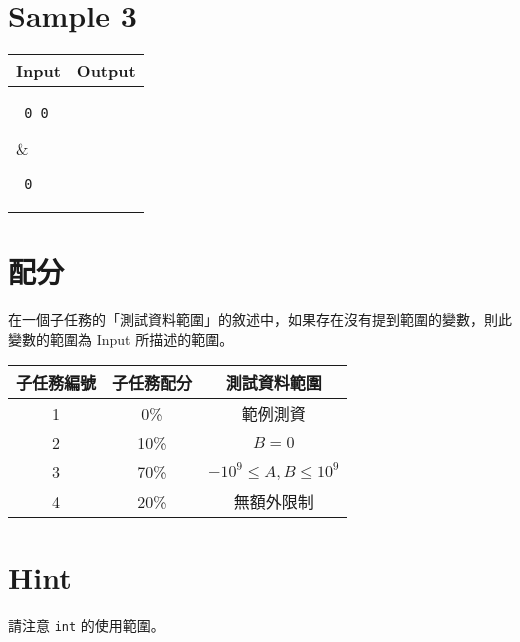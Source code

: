 \documentclass[11pt,a4paper]{article}
\begin{document}
\section*{Sample 3}
\begin{longtable}[!h]{|p{}|p{}|}
\hline
\textbf {Input}	& \textbf {Output} \\
\hline
\parbox[t]{0.5\textwidth} %
{ \tt
0 0 \\
} &
\parbox[t]{0.5\textwidth}
{ \tt
0 \\
} \\
\hline
\end{longtable}

\section*{配分}

在一個子任務的「測試資料範圍」的敘述中，如果存在沒有提到範圍的變數，則此變數的範圍為 Input 所描述的範圍。

\begin{center}
 \begin{tabular}{||c c c||} 
 \hline
 子任務編號 & 子任務配分 & 測試資料範圍 \\  
 \hline\hline
 1 & 0\% & 範例測資 \\ 
 \hline
 2 & 10\% & $B = 0$ \\
 \hline
 3 & 70\% & $-10^9 \le A, B \le 10^9$ \\
 \hline
 4 & 20\% & 無額外限制 \\
 \hline
\end{tabular}
\end{center}

\section*{Hint}
請注意 \texttt{int} 的使用範圍。
\end{document}
